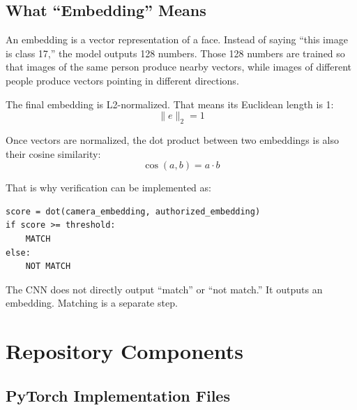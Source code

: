 \documentclass[11pt]{article}
\begin{document}
\subsection{What ``Embedding'' Means}

An embedding is a vector representation of a face.
Instead of saying ``this image is class 17,'' the model outputs 128 numbers.
Those 128 numbers are trained so that images of the same person produce nearby vectors, while images of different people produce vectors pointing in different directions.

The final embedding is L2-normalized.
That means its Euclidean length is 1:
\[
  \lVert e \rVert_2 = 1
\]

Once vectors are normalized, the dot product between two embeddings is also their cosine similarity:
\[
  \cos(a,b) = a \cdot b
\]

That is why verification can be implemented as:

\begin{lstlisting}
score = dot(camera_embedding, authorized_embedding)
if score >= threshold:
    MATCH
else:
    NOT MATCH
\end{lstlisting}

The CNN does not directly output ``match'' or ``not match.''
It outputs an embedding.
Matching is a separate step.

\section{Repository Components}

\subsection{PyTorch Implementation Files}
\end{document}
